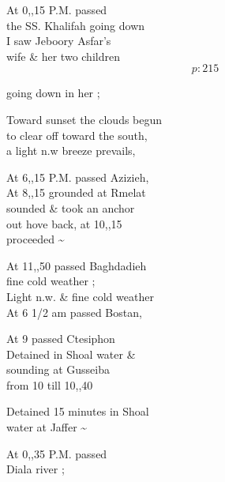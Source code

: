 \documentclass{report}
\begin{document}
	\par{
 	At 0,,15 P.M. passed\ \\the SS. Khalifah going down\ \\I saw Jeboory Asfar's\ \\wife \& her two children\ \\
  \[p: 215 \]

	}



	\par{
 	going down in her ;\ \\
	}

	\par{
 	Toward sunset the clouds begun\ \\to clear off toward the south,\ \\a light n.w breeze prevails,\ \\
	}

	\par{
 	At 6,,15 P.M. passed Azizieh,\ \\At 8,,15 grounded at Rmelat\ \\sounded \& took an anchor\ \\out hove back, at 10,,15\ \\proceeded \~{}\ \\
	}

	\par{
 	At 11,,50 passed Baghdadieh\ \\fine cold weather ;\ \\Light n.w. \& fine cold weather\ \\At 6 1/2 am passed Bostan,\ \\
	}

	\par{
 	At 9 passed Ctesiphon\ \\Detained in Shoal water \&\ \\sounding at Gusseiba\ \\from 10 till 10,,40\ \\
	}

	\par{
 	Detained 15 minutes in Shoal\ \\water at Jaffer \~{}\ \\
	}

	\par{
 	At 0,,35 P.M. passed\ \\Diala river ;\ \\
	}
\end{document}
